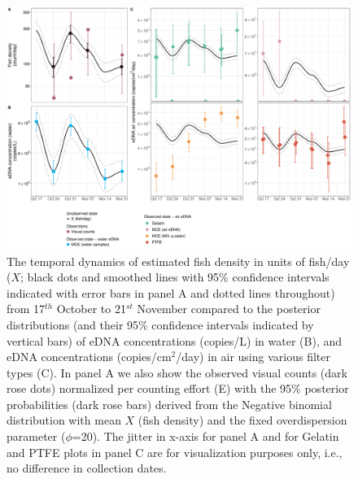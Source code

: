 \documentclass{article}
\begin{document}
\begin{figure}[tbhp] 
\centering
\includegraphics[width=16.5cm]{Plots/Figure_2.pdf}  
\caption{The temporal dynamics of estimated fish density in units of fish/day ($X$; black dots and smoothed lines with 95\% confidence intervals indicated with error bars in panel A and dotted lines throughout) from 17$^{th}$ October to 21$^{st}$ November compared to the posterior distributions (and their 95\% confidence intervals indicated by vertical bars) of eDNA concentrations (copies/L) in water (B), and eDNA concentrations (copies/cm$^2$/day) in air using various filter types (C). In panel A we also show the observed visual counts (dark rose dots) normalized per counting effort (E) with the 95\% posterior probabilities (dark rose bars) derived from the Negative binomial distribution with mean $X$ (fish density) and the fixed overdispersion parameter ($\phi$=20). The jitter in x-axis for panel A and for Gelatin and PTFE plots in panel C are for visualization purposes only, i.e., no difference in collection dates.}
\label{fig:fig1}
\end{figure}
\end{document}
